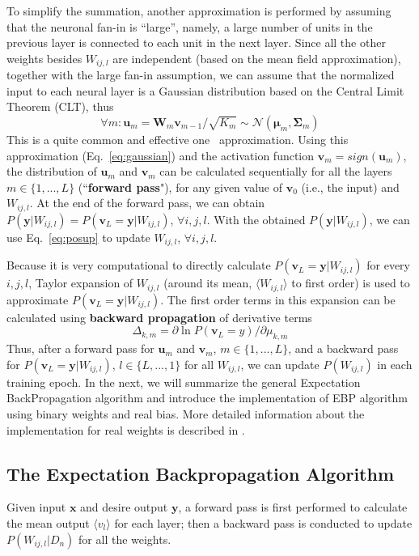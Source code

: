 \documentclass{article} %
\begin{document}
To simplify the summation, another approximation is performed by assuming that the neuronal fan-in is ``large'', namely, a large number of units in the previous layer is connected to each unit in the next layer. Since all the other weights besides $W_{ij,l}$ are independent (based on the mean field approximation), together with the large fan-in assumption, we can assume that the normalized input to each neural layer is a Gaussian distribution based on the Central Limit Theorem (CLT), thus
\begin{equation} \label{eq:gaussian}
 \forall{m}: \textbf{u}_m=\textbf{W}_m\textbf{v}_{m-1}/\sqrt{K_m} \sim \mathcal{N}(\bm{\mu}_m, \bm{\Sigma}_m)
\end{equation}
This is a quite common and effective one~\citep{ribeiro2011expectation} approximation. Using this approximation (Eq.~\ref{eq:gaussian}) and the activation function $\textbf{v}_m=sign(\textbf{u}_m)$, the distribution of $\textbf{u}_m$ and $\textbf{v}_m$ can be calculated sequentially for all the layers $m \in \{1,...,L\}$ (``\textbf{forward pass}"), for any given value of $\textbf{v}_0$ (i.e., the input) and $W_{ij,l}$. At the end of the forward pass, we can obtain $P(\textbf{y}|W_{ij,l})=P(\textbf{v}_L =\textbf{y}|W_{ij,l})$, $\forall {i,j,l}$. With the obtained $P(\textbf{y}|W_{ij,l})$, we can use Eq.~\ref{eq:posup} to update $W_{ij,l}$, $\forall {i,j,l}$.

Because it is very computational to directly calculate $P(\textbf{v}_L =\textbf{y}|W_{ij,l})$ for every $i, j, l$, Taylor expansion of $W_{ij,l}$ (around its mean, $\langle W_{ij,l} \rangle$ to first order) is used to approximate $P(\textbf{v}_L =\textbf{y}|W_{ij,l})$. The first order terms in this expansion can be calculated using \textbf{backward propagation} of derivative terms
\begin{equation} \label{eq:deriv}
    \Delta_{k,m}=\partial{\ln{P(\textbf{v}_L=y)}}/\partial{\mu_{k,m}}
\end{equation}
Thus, after a forward pass for $\textbf{u}_m$ and $\textbf{v}_m$, $m \in \{1,...,L\}$, and a backward pass for $P(\textbf{v}_L =\textbf{y}|W_{ij,l})$, $l \in \{L,...,1\}$ for all $W_{ij,l}$, we can update $P(W_{ij,l})$ in each training epoch. In the next, we will summarize the general Expectation BackPropagation algorithm and introduce the implementation of EBP algorithm using binary weights and real bias. More detailed information about the implementation for real weights is described in \citet{Soudry14}.

\subsection{The Expectation Backpropagation Algorithm}
Given input $\textbf{x}$ and desire output $\textbf{y}$, a forward pass is first performed to calculate the mean output $\langle v_l \rangle$ for each layer; then a backward pass is conducted to update $P(W_{ij,l}|D_n)$ for all the weights.
\end{document}
